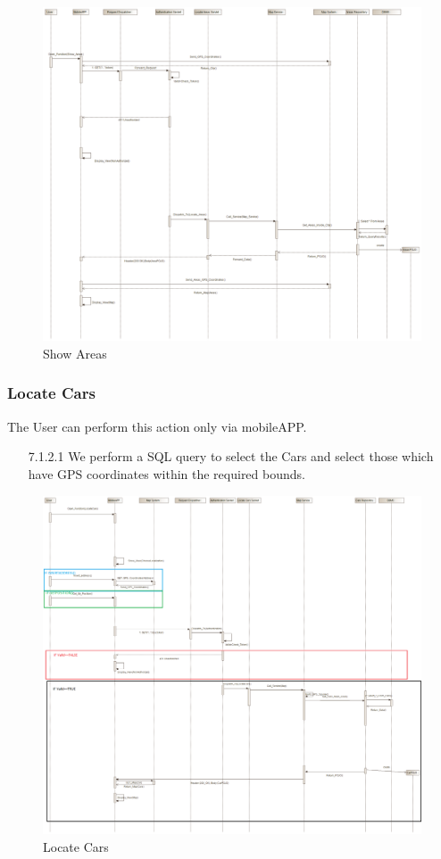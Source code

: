\documentclass[12pt]{article}
\begin{document}
\begin{figure}[h]
	\centering
	\includegraphics[width=\textwidth]{../Images/Sequence_Final/Show_Areas}
	\caption{Show Areas}
\end{figure}
\clearpage
\subsubsection{Locate Cars}
The User can perform this action only via mobileAPP.

\begin{enumerate}
	\item[7.1.2.1] We perform a SQL query to select the Cars and select those which have GPS coordinates within the required bounds.
\end{enumerate}

\begin{figure}[h]
	\centering
	\includegraphics[width=\textwidth]{../Images/Sequence_Final/Locate_Cars}
	\caption{Locate Cars}
\end{figure}
\clearpage
\end{document}
